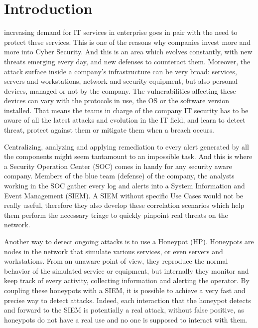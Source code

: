 \documentclass{tnreport}
\begin{document}
\renewcommand{\baselinestretch}{0.5}\normalsize
\tableofcontents
\renewcommand{\baselinestretch}{1.0}\normalsize
\cleardoublepage

\setcounter{page}{1}

\chapter{Introduction}
 increasing demand for IT services in enterprise goes in pair with the need to protect these services. This is one of the reasons why companies invest more and more into Cyber Security. And this is an area which evolves constantly, with new threats emerging every day, and new defenses to counteract them. \eol Moreover, the attack surface inside a company's infrastructure can be very broad: services, servers and workstations, network and security equipment, but also personal devices, managed or not by the company. The vulnerabilities affecting these devices can vary with the protocols in use, the OS or the software version installed. That means the teams in charge of the company IT security has to be aware of all the latest attacks and evolution in the IT field, and learn to detect threat, protect against them or mitigate them when a breach occurs.

Centralizing, analyzing and applying remediation to every alert generated by all the components might seem tantamount to an impossible task. And this is where a Security Operation Center (\gls{SOC}) comes in handy for any security aware company. Members of the blue team (defense) of the company, the analysts working in the \gls{SOC} gather every log and alerts into a System Information and Event Management (\gls{SIEM}). A \gls{SIEM} without specific Use Cases would not be really useful, therefore they also develop these correlation scenarios which help them perform the necessary triage to quickly pinpoint real threats on the network.

Another way to detect ongoing attacks is to use a Honeypot (HP). Honeypots are nodes in the network that simulate various services, or even servers and workstations. From an unaware point of view, they reproduce the normal behavior of the simulated service or equipment, but internally they monitor and keep track of every activity, collecting information and alerting the operator. By coupling these honeypots with a \gls{SIEM}, it is possible to achieve a very fast and precise way to detect attacks. Indeed, each interaction that the honeypot detects and forward to the \gls{SIEM} is potentially a real attack, without false positive, as honeypots do not have a real use and no one is supposed to interact with them.
\end{document}
